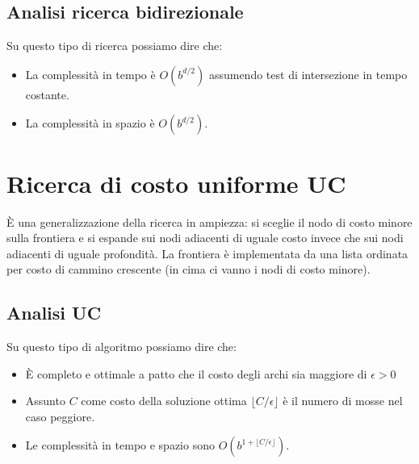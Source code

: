 \subsection{Analisi ricerca bidirezionale}
Su questo tipo di ricerca possiamo dire che:
\begin{itemize}
	\item La complessit\`a in tempo \`e $O(b^{d/2})$ assumendo test di intersezione in
	      tempo costante.
	\item La complessit\`a in spazio \`e $O(b^{d/2})$.
\end{itemize}

\section{Ricerca di costo uniforme UC}
\`E una generalizzazione della ricerca in ampiezza: si sceglie il nodo di costo minore sulla
frontiera e si espande sui nodi adiacenti di uguale costo invece che sui nodi adiacenti di
uguale profondit\`a.
La frontiera \`e implementata da una lista ordinata per costo di cammino crescente (in cima
ci vanno i nodi di costo minore).

\subsection{Analisi UC}
Su questo tipo di algoritmo possiamo dire che:
\begin{itemize}
	\item \`E completo e ottimale a patto che il costo degli archi sia maggiore di
	      $\epsilon > 0$
	\item Assunto $C$ come costo della soluzione ottima $\lfloor C/\epsilon \rfloor$ \`e
	      il numero di mosse nel caso peggiore.
	\item Le complessit\`a in tempo e spazio sono $O(b^{1+\lfloor C/\epsilon \rfloor})$.
\end{itemize}
